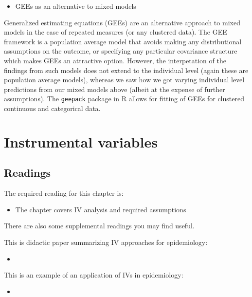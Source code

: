 \documentclass[
]{book}
\providecommand{\tightlist}{%
  \setlength{\itemsep}{0pt}\setlength{\parskip}{0pt}}
\begin{document}
\begin{itemize}
\tightlist
\item
  GEEs as an alternative to mixed models
\end{itemize}

Generalized estimating equations (GEEs) are an alternative approach to mixed models
in the case of repeated measures (or any clustered data). The GEE framework is a
population average model that avoids making any distributional assumptions on the
outcome, or specifying any particular covariance structure which makes GEEs an attractive
option. However, the interpetation of the findings from such models does not extend
to the individual level (again these are population average models), whereas we
saw how we got varying individual level predictions from our mixed models above (albeit
at the expense of further assumptions). The \texttt{geepack} package in R allows for fitting
of GEEs for clustered continuous and categorical data.

\hypertarget{instrumental-variables}{%
\chapter{Instrumental variables}\label{instrumental-variables}}

\hypertarget{readings-7}{%
\section{Readings}\label{readings-7}}

The required reading for this chapter is:

\begin{itemize}
\tightlist
\item
  \citet{hernanch16} The chapter covers IV analysis and required assumptions
\end{itemize}

There are also some supplemental readings you may find useful.

This is didactic paper summarizing IV approaches for epidemiology:

\begin{itemize}
\tightlist
\item
  \citet{greenland2000introduction}
\end{itemize}

This is an example of an application of IVs in epidemiology:

\begin{itemize}
\tightlist
\item
  \citet{austin2016does}
\end{itemize}
\end{document}
